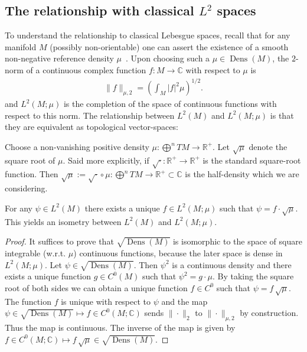 \documentclass[final,leqno]{siamart}
\DeclareMathOperator{\Dens}{Dens}
\begin{document}
\subsection{The relationship with classical $L^{2}$ spaces}
\label{sec:classical_Lebesgue}
To understand the relationship to classical Lebesgue spaces, recall that for any manifold $M$ (possibly non-orientable) one can assert the existence of a smooth non-negative reference density $\mu$~\cite[Chapter 16]{Lee2006}.
Upon choosing such a $\mu \in \Dens(M)$, the $2$-norm of a continuous complex function $f:M \to \mathbb{C}$ with respect to $\mu$ is
\begin{align*}
	\| f \|_{\mu,2} =  \left( \int_M |f|^2 \mu \right)^{1/2}.
\end{align*}
and $L^2(M ; \mu)$ is the completion of the space of continuous functions with respect to this norm.
The relationship between $L^{2}(M)$ and $L^{2}(M;\mu)$ is that they are equivalent as topological vector-spaces:
\begin{proposition} \label{prop:non canonical}
	Choose a non-vanishing positive density $\mu : \bigoplus^{n}TM \to \mathbb{R}^{+}$.
	Let $\sqrt{\mu}$ denote the square root of $\mu$.
	Said more explicitly, if $\sqrt{\cdot}: \mathbb{R}^{+} \to \mathbb{R}^{+}$ is the standard square-root function.
	Then $\sqrt{\mu} := \sqrt{\cdot} \circ \mu : \bigoplus^{n} TM \to \mathbb{R}^{+} \subset \mathbb{C}$ is the half-density which we are considering.
	
	For any $\psi \in L^2(M)$ there exists a unique $f \in L^2(M ; \mu)$ such that $\psi = f \cdot  \sqrt{\mu}$.
	This yields an isometry between $L^2(M)$ and $L^2(M ; \mu)$.
\end{proposition}
\begin{proof}
	It suffices to prove that $\sqrt{\Dens(M)}$ is isomorphic to the space of square integrable (w.r.t. $\mu$) continuous functions, because
	the later space is dense in $L^{2}(M;\mu)$.
	Let $\psi \in \sqrt{\Dens(M)}$.  Then $\psi^2$ is a continuous density and there exists a unique function $g \in C^{0}(M)$ such that $\psi^{2} = g \cdot \mu$.
	By taking the square root of both sides we can obtain a unique function $f \in C^{0}$ such that $\psi = f\, \sqrt{\mu}$.
	The function $f$ is unique with respect to $\psi$ and
	the map $\psi \in \sqrt{\Dens(M)} \mapsto f \in C^0(M ; \mathbb{C} )$ sends $\| \cdot \|_{2}$ to $\| \cdot \|_{\mu,2}$ by construction.
	Thus the map is continuous.
	The inverse of the map is given by $f \in C^{0}(M;\mathbb{C}) \mapsto f \, \sqrt{\mu} \in \sqrt{\Dens(M)}$.
\end{proof}
\end{document}
